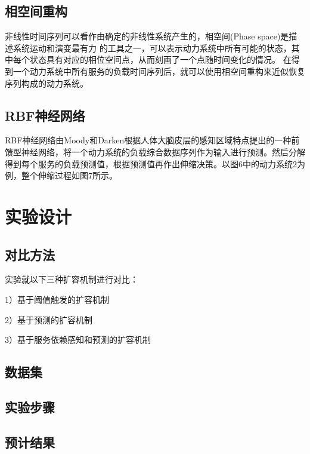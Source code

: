 \documentclass[10.5pt,twocolumn]{jbuaa}
\begin{document}
\subsection{相空间重构}
非线性时间序列可以看作由确定的非线性系统产生的，相空间(Phase space)是描述系统运动和演变最有力 的工具之一，可以表示动力系统中所有可能的状态，其中每个状态具有对应的相位空间点，从而刻画了一个点随时间变化的情况。
在得到一个动力系统中所有服务的负载时间序列后，就可以使用相空间重构来近似恢复序列构成的动力系统。

\subsection{RBF神经网络}
RBF神经网络由Moody和Darken根据人体大脑皮层的感知区域特点提出的一种前馈型神经网络，将一个动力系统的负载综合数据序列作为输入进行预测。然后分解得到每个服务的负载预测值，根据预测值再作出伸缩决策。以图6中的动力系统2为例，整个伸缩过程如图7所示。



\section{实验设计}

\subsection{对比方法}
实验就以下三种扩容机制进行对比：

1）基于阈值触发的扩容机制

2）基于预测的扩容机制

3）基于服务依赖感知和预测的扩容机制

\subsection{数据集}

\subsection{实验步骤}

\subsection{预计结果}





\renewcommand\refname{\hei\wuhao\centerline{参考文献}\global\def\refname{参考文献}}
\vskip 12pt

\let\OLDthebibliography\thebibliography
\renewcommand\thebibliography[1]{
  \OLDthebibliography{#1}
  \setlength{\parskip}{0pt}
  \setlength{\itemsep}{0pt plus 0.3ex}
}

{
\renewcommand{\baselinestretch}{0.9}
\liuhao


}
\end{document}

